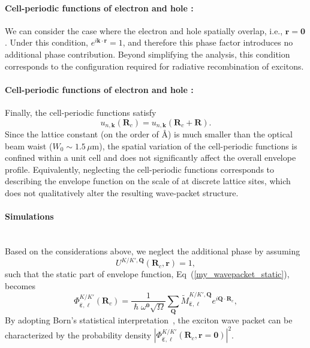 \paragraph*{Cell-periodic functions of electron and hole : }
We can consider the case where the electron and hole spatially overlap, i.e., $\boldsymbol{r} = \boldsymbol{0}$. Under this condition, $e^{i\boldsymbol{k}\cdot\boldsymbol{r}} = 1$, and therefore this phase factor introduces no additional phase contribution. Beyond simplifying the analysis, this condition corresponds to the configuration required for radiative recombination of excitons.
\vspace{-1em}
\paragraph*{Cell-periodic functions of electron and hole : }
Finally, the cell-periodic functions satisfy
\begin{equation}
u_{n,\boldsymbol{k}}(\boldsymbol{R}_c)
=
u_{n,\boldsymbol{k}}(\boldsymbol{R}_c+\boldsymbol{R}).
\end{equation}
Since the lattice constant (on the order of \AA) is much smaller than the optical beam waist
($W_0\sim1.5\,\mu\mathrm{m}$),
the spatial variation of the cell-periodic functions is confined within a unit cell and does not significantly affect the overall envelope profile.
Equivalently, neglecting the cell-periodic functions corresponds to describing the envelope function on the scale of at discrete lattice sites, which does not qualitatively alter the resulting wave-packet structure.

\clearpage
\paragraph*{Simulations}~\\
Based on the considerations above, we neglect the additional phase by assuming 
$$
U^{K/K',\boldsymbol{Q}} (\boldsymbol{R}_c,\boldsymbol{r})=1,
$$
such that the static part of envelope function, Eq~(\ref{my_wavepacket_static}), becomes
\begin{equation}
\Phi^{K/K'}_{\hat{\boldsymbol{\varepsilon}}, \ell}(\boldsymbol{R}_c)
=
\frac{1}{\hslash \omega^{\boldsymbol{0}} \sqrt{\Omega}}
\sum_{\boldsymbol{Q}}
\tilde{M}_{\hat{\boldsymbol{\varepsilon}}, \ell}^{K/K',\boldsymbol{Q}}
e^{i\boldsymbol{Q}\cdot\boldsymbol{R}_c},
\label{envelope_valley_K}
\end{equation}
By adopting Born's statistical interpretation~\cite{griffiths2018introduction}, the exciton wave packet can be characterized by the probability density $|\Phi^{K/K'}_{\hat{\boldsymbol{\varepsilon}}, \ell}(\boldsymbol{R}_c, \boldsymbol{r}=\boldsymbol{0})|^2$. 

